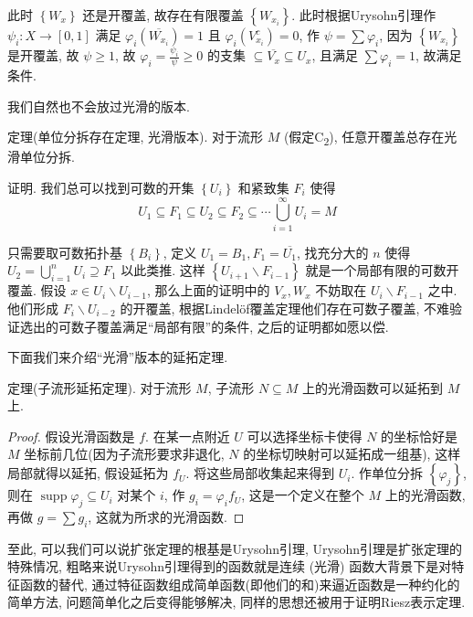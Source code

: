 \documentclass[options]{article}
\begin{document}
此时 $\left\{W_x\right\}$ 还是开覆盖, 故存在有限覆盖 $\left\{W_{x_i}\right\}$. 此时根据Urysohn引理作 $\psi_i: X \rightarrow[0,1]$ 满足 $\varphi_i\left(\overline{W_{x_i}}\right)=1$ 且 $\varphi_i\left(V_{x_i}^c\right)=0$, 作 $\psi=\sum \varphi_i$, 因为 $\left\{W_{x_i}\right\}$ 是开覆盖, 故 $\psi \geq 1$, 故 $\varphi_i=\frac{\psi_i}{\psi} \geq 0$ 的支集 $\subseteq \overline{V_x} \subseteq U_x$, 且满足 $\sum \varphi_i=1$, 故满足条件.

\begin{remark}
	我们自然也不会放过光滑的版本.

	\hrulefill

	定理(单位分拆存在定理, 光滑版本). 对于流形 $M$ (假定C\textsubscript{2}), 任意开覆盖总存在光滑单位分拆.
\end{remark}
证明. 我们总可以找到可数的开集 $\left\{U_i\right\}$ 和紧致集 $F_i$ 使得
\[
		U_1 \subseteq F_1 \subseteq U_2 \subseteq F_2 \subseteq \cdots \bigcup_{i=1}^{\infty} U_i=M
\]

只需要取可数拓扑基 $\left\{B_i\right\}$, 定义 $U_1=B_1, F_1=\overline{U_1}$, 找充分大的 $n$ 使得 $U_2=\bigcup_{i=1}^n U_i \supseteq F_1$ 以此类推. 这样 $\left\{U_{i+1} \backslash F_{i-1}\right\}$ 就是一个局部有限的可数开覆盖. 假设 $x \in U_i \backslash U_{i-1}$, 那么上面的证明中的 $V_x, W_x$ 不妨取在 $U_i \backslash F_{i-1}$ 之中. 他们形成 $F_i \backslash U_{i-2}$ 的开覆盖, 根据Lindelöf覆盖定理他们存在可数子覆盖, 不难验证选出的可数子覆盖满足“局部有限”的条件, 之后的证明都如愿以偿.

\begin{remark}
	下面我们来介绍“光滑”版本的延拓定理.

	\hrulefill

	定理(子流形延拓定理). 对于流形 $M$, 子流形 $N \subseteq M$ 上的光滑函数可以延拓到 $M$ 上.
\end{remark}
\begin{proof}
	假设光滑函数是 $f$. 在某一点附近 $U$ 可以选择坐标卡使得 $N$ 的坐标恰好是 $M$ 坐标前几位(因为子流形要求非退化, $N$ 的坐标切映射可以延拓成一组基), 这样局部就得以延拓, 假设延拓为 $f_U$. 将这些局部收集起来得到 $U_i$. 作单位分拆 $\left\{\varphi_j\right\}$, 则在 $\operatorname{supp} \varphi_j \subseteq U_i$ 对某个 $i$, 作 $g_i=\varphi_i f_U$, 这是一个定义在整个 $M$ 上的光滑函数, 再做 $g=\sum g_i$, 这就为所求的光滑函数.
\end{proof}
至此, 可以我们可以说扩张定理的根基是Urysohn引理, Urysohn引理是扩张定理的特殊情况, 粗略来说Urysohn引理得到的函数就是连续 (光滑) 函数大背景下是对特征函数的替代, 通过特征函数组成简单函数(即他们的和)来逼近函数是一种约化的简单方法, 问题简单化之后变得能够解决, 同样的思想还被用于证明Riesz表示定理.
\end{document}
